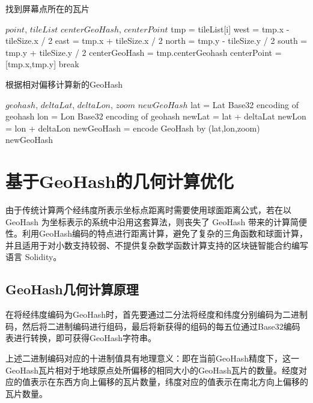 \begin{algorithm}[h]
  \caption{找到屏幕点所在的瓦片}
  \label{alg:findCenterTile}
  \begin{algorithmic}[1]
  \REQUIRE $point$, $tileList$
  \ENSURE $centerGeoHash$, $centerPoint$
    \STATE tmp = tileList[i]
    \STATE west = tmp.x - tileSize.x / 2
    \STATE east = tmp.x + tileSize.x / 2
    \STATE north = tmp.y - tileSize.y / 2
    \STATE south = tmp.y + tileSize.y / 2
      \STATE centerGeoHash = tmp.centerGeohash
      \STATE centerPoint = [tmp.x,tmp.y]
      \STATE break
    \ENDIF
  \ENDFOR
  \end{algorithmic}
\end{algorithm}

\begin{algorithm}[h]
  \caption{根据相对偏移计算新的GeoHash}
  \label{alg:newGeoHash}
  \begin{algorithmic}[1]
  \REQUIRE $geohash$, $deltaLat$, $deltaLon$, $zoom$
  \ENSURE $newGeoHash$
  \STATE lat = Lat Base32 encoding of geohash
	\STATE lon = Lon Base32 encoding of geohash
	\STATE newLat = lat + deltaLat
	\STATE newLon = lon + deltaLon
	\STATE newGeoHash = encode GeoHash by (lat,lon,zoom)
  \RETURN newGeoHash
  \end{algorithmic}
\end{algorithm}


\section{基于GeoHash的几何计算优化}
由于传统计算两个经纬度所表示坐标点距离时需要使用球面距离公式，若在以 GeoHash 为坐标表示的系统中沿用这套算法，则丧失了 GeoHash 带来的计算简便性。利用GeoHash编码的特点进行距离计算，避免了复杂的三角函数和球面计算，并且适用于对小数支持较弱、不提供复杂数学函数计算支持的区块链智能合约编写语言 Solidity。

\subsection{GeoHash几何计算原理}
在将经纬度编码为GeoHash时，首先要通过二分法将经度和纬度分别编码为二进制码，然后将二进制编码进行组码，最后将新获得的组码的每五位通过Base32编码表进行转换，即可获得GeoHash字符串。

上述二进制编码对应的十进制值具有地理意义：即在当前GeoHash精度下，这一GeoHash瓦片相对于地球原点处所偏移的相同大小的GeoHash瓦片的数量。经度对应的值表示在东西方向上偏移的瓦片数量，纬度对应的值表示在南北方向上偏移的瓦片数量。

